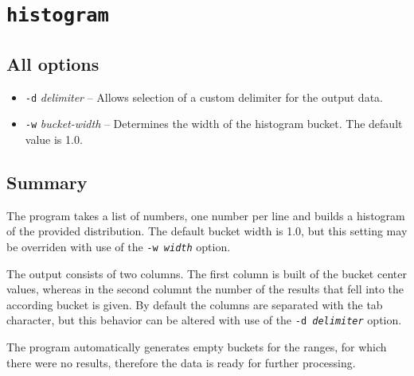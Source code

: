 
\section{\texttt{histogram}}

	\subsection{All options}
	\begin{itemize}
		\item \texttt{-d} \textit{delimiter} -- Allows selection of a custom
			delimiter for the output data.
		\item \texttt{-w} \textit{bucket-width} -- Determines the width of the
			histogram bucket. The default value is 1.0.
	\end{itemize}

	\subsection{Summary}
	The program takes a list of numbers, one number per line and builds
	a histogram of the provided distribution. The default bucket width is 1.0,
	but this setting may be overriden with use of the \texttt{-w \textit{width}}
	option.

	The output consists of two columns. The first column is built of the bucket
	center values, whereas in the second columnt the number of the results that
	fell into the according bucket is given. By default the columns are separated
	with the tab character, but this behavior can be altered with use of the
	\texttt{-d \textit{delimiter}} option.

	The program automatically generates empty buckets for the ranges, for which
	there were no results, therefore the data is ready for further processing.

